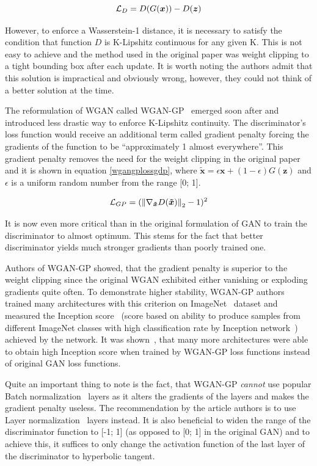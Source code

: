 \begin{equation}
\mathcal{L}_D = D(G(\bm{x})) - D(\bm{z})
\label{wganlossd}
\end{equation}

However, to enforce a Wasserstein-1 distance, it is necessary to satisfy the condition that function $D$ is K-Lipshitz continuous for any given K. This is not easy to achieve and the method used in the original paper was weight clipping to a tight bounding box after each update. It is worth noting the authors admit that this solution is impractical and obviously wrong, however, they could not think of a better solution at the time.

The reformulation of WGAN called WGAN-GP~\cite{wgan-gp} emerged soon after and introduced less drastic way to enforce K-Lipshitz continuity. The discriminator's loss function would receive an additional term called gradient penalty forcing the gradients of the function to be ``approximately 1 almost everywhere''. This gradient penalty removes the need for the weight clipping in the original paper and it is shown in equation \ref{wgangplossgdp}, where $\bm{\tilde{x}} = \epsilon\bm{x} + (1 - \epsilon)G(\bm{z})$ and $\epsilon$ is a uniform random number from the range [0; 1].

\begin{equation}
\mathcal{L}_{GP} = (\left\lVert\nabla_{\bm{\tilde{x}}}D(\bm{\tilde{x}})\right\rVert_2 - 1)^2
\label{wgangplossgdp}
\end{equation}

It is now even more critical than in the original formulation of GAN to train the discriminator to almost optimum. This stems for the fact that better discriminator yields much stronger gradients than poorly trained one.

Authors of WGAN-GP showed, that the gradient penalty is superior to the weight clipping since the original WGAN exhibited either vanishing or exploding gradients quite often. To demonstrate higher stability, WGAN-GP authors trained many architectures with this criterion on ImageNet~\cite{imagenet} dataset and measured the Inception score~\cite{improvedgan} (score based on ability to produce samples from different ImageNet classes with high classification rate by Inception network~\cite{inception}) achieved by the network. It was shown~\cite{wgan-gp}, that many more architectures were able to obtain high Inception score when trained by WGAN-GP loss functions instead of original GAN loss functions.

Quite an important thing to note is the fact, that WGAN-GP {\em cannot} use popular Batch normalization~\cite{batchnorm} layers as it alters the gradients of the layers and makes the gradient penalty useless. The recommendation by the article authors is to use Layer normalization~\cite{layernorm} layers instead. It is also beneficial to widen the range of the discriminator function to [-1; 1] (as opposed to [0; 1] in the original GAN) and to achieve this, it suffices to only change the activation function of the last layer of the discriminator to hyperbolic tangent.

